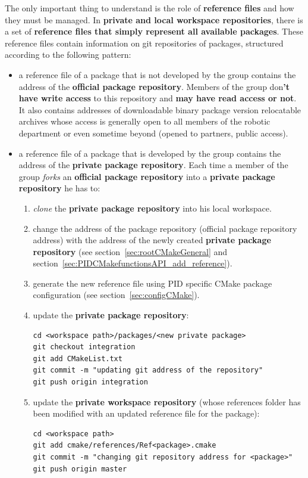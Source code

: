 \documentclass[12pt,a4paper]{article}
\begin{document}
The only important thing to understand is the role of \textbf{reference files} and how they must be managed. In \textbf{private and local workspace repositories}, there is a set of \textbf{reference files that simply represent all available packages}. These reference files contain information on git repositories of packages, structured according to the following pattern:
\begin{itemize}
\item a reference file of a package that is not developed by the group contains the address of the \textbf{official package repository}. Members of the group don\textbf{'t have write access} to this repository and \textbf{may have read access or not}. It also contains addresses of downloadable binary package version relocatable archives whose access is generally open to all members of the robotic department or even sometime beyond (opened to partners, public access).
\item a reference file of a package that is developed by the group contains the address of the \textbf{private package repository}. Each time a member of the group \textit{forks} an \textbf{official package repository} into a \textbf{private package repository} he has to:
\begin{enumerate}
\item \textit{clone} the \textbf{private package repository} into his local workspace.
\item change the address of the package repository (official package repository address) with the address of the newly created \textbf{private package repository} (see section~\ref{sec:rootCMakeGeneral} and section~\ref{sec:PIDCMakefunctionsAPI_add_reference}).
\item generate the new reference file using PID specific CMake package configuration (see section~\ref{sec:configCMake}).
\item update the \textbf{private package repository}:
\begin{verbatim}
cd <workspace path>/packages/<new private package>
git checkout integration
git add CMakeList.txt
git commit -m "updating git address of the repository"
git push origin integration
\end{verbatim}
\item update the \textbf{private workspace repository} (whose references folder has been modified with an updated reference file for the package):
\begin{verbatim}
cd <workspace path>
git add cmake/references/Ref<package>.cmake
git commit -m "changing git repository address for <package>"
git push origin master
\end{verbatim}
\end{enumerate}
\end{itemize}
\end{document}
